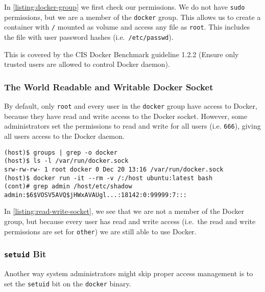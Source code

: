 In \autoref{listing:docker-group} we first check our permissions. We do not have \lstinline{sudo} permissions, but we are a member of the \lstinline{docker} group. This allows us to create a container with \lstinline{/} mounted as volume and access any file as \lstinline{root}. This includes the file with user password hashes (i.e.\ \lstinline{/etc/passwd}).

\medskip

This is covered by the CIS Docker Benchmark guideline 1.2.2 (Ensure only trusted users are allowed to control Docker daemon).

\subsubsection{The World Readable and Writable Docker Socket}
By default, only \lstinline{root} and every user in the \lstinline{docker} group have access to Docker, because they have read and write access to the Docker socket. However, some administrators set the permissions to read and write for all users (i.e. \lstinline{666}), giving all users access to the Docker daemon.

\begin{lstlisting}[caption={All users can use Docker if they have read and write access to the Socket},captionpos=b,label={listing:read-write-socket}]
(host)$ groups | grep -o docker
(host)$ ls -l /var/run/docker.sock
srw-rw-rw- 1 root docker 0 Dec 20 13:16 /var/run/docker.sock
(host)$ docker run -it --rm -v /:/host ubuntu:latest bash
(cont)# grep admin /host/etc/shadow
admin:$6$VOSV5AVQ$jHWxAVAUgl...:18142:0:99999:7:::
\end{lstlisting}

In \autoref{listing:read-write-socket}, we see that we are not a member of the Docker group, but because every user has read and write access (i.e.\ the read and write permissions are set for \lstinline{other}) we are still able to use Docker.

\subsubsection{\texorpdfstring{\lstinline{setuid}}{setuid} Bit}\label{subsubsection:setuid}
Another way system administrators might skip proper access management is to set the \lstinline{setuid} bit on the \lstinline{docker} binary.

\medskip

